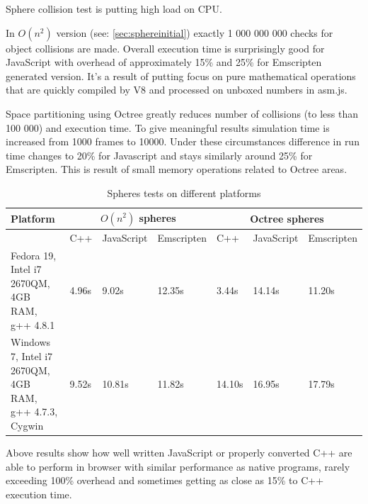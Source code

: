 Sphere collision test is putting high load on CPU. 

In $O(n^2)$ version (see: \ref{sec:sphereinitial}) exactly 1 000 000 000 checks for object collisions are made. Overall execution time is surprisingly good for JavaScript with overhead of approximately 15\% and 25\% for Emscripten generated version. It's a result of putting focus on pure mathematical operations that are quickly compiled by V8 and processed on unboxed numbers in asm.js.

Space partitioning using Octree greatly reduces number of collisions (to less than 100 000) and execution time. To give meaningful results simulation time is increased from 1000 frames to 10000. Under these circumstances difference in run time changes to 20\% for Javascript and stays similarly around 25\% for Emscripten. This is result of small memory operations related to Octree areas.

\begin{table}[h!]
\caption{Spheres tests on different platforms}
\label{table:benchmarks}
\begin{tabular}{|p{4cm}||l|l|l||l|l|l|}
   \hline
   Platform & \multicolumn{3}{c}{$O(n^2)$ spheres} & \multicolumn{3}{c}{Octree spheres}\\ \hline
   & C++ & JavaScript & Emscripten & C++ & JavaScript & Emscripten\\ \hline
   Fedora 19, Intel i7 2670QM, 4GB RAM, g++ 4.8.1 & 4.96s & 9.02s & 12.35s & 
3.44s & 14.14s & 11.20s \\ \hline
   Windows 7, Intel i7 2670QM, 4GB RAM, g++ 4.7.3, Cygwin & 9.52s & 10.81s & 11.82s & 14.10s & 16.95s & 17.79s \\\hline
\end{tabular}
\end{table}

Above results show how well written JavaScript or properly converted C++ are able to perform in browser with similar performance as native programs, rarely exceeding 100\% overhead and sometimes getting as close as 15\% to C++ execution time. 
